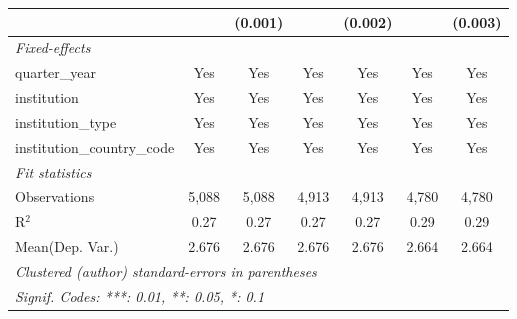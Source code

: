 \begin{tabular}{lcccccc}
                                      &               & (0.001)       &               & (0.002)      &               & (0.003)\\   
   \midrule
   \emph{Fixed-effects}\\
   quarter\_year                      & Yes           & Yes           & Yes           & Yes          & Yes           & Yes\\  
   institution                        & Yes           & Yes           & Yes           & Yes          & Yes           & Yes\\  
   institution\_type                  & Yes           & Yes           & Yes           & Yes          & Yes           & Yes\\  
   institution\_country\_code         & Yes           & Yes           & Yes           & Yes          & Yes           & Yes\\  
   \midrule
   \emph{Fit statistics}\\
   Observations                       & 5,088         & 5,088         & 4,913         & 4,913        & 4,780         & 4,780\\  
   R$^2$                              & 0.27          & 0.27          & 0.27          & 0.27         & 0.29          & 0.29\\  
Mean(Dep. Var.) & 2.676 & 2.676 & 2.676 & 2.676 & 2.664 & 2.664 \\
   \midrule \midrule
   \multicolumn{7}{l}{\emph{Clustered (author) standard-errors in parentheses}}\\
   \multicolumn{7}{l}{\emph{Signif. Codes: ***: 0.01, **: 0.05, *: 0.1}}\\
\end{tabular}
\par\endgroup
